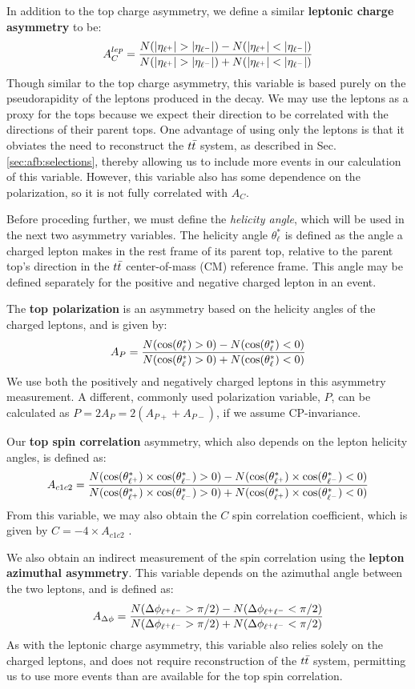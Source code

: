In addition to the top charge asymmetry, we define a similar
\textbf{leptonic charge asymmetry} to be:
\begin{equation}
A_C^{lep} = \asymmetry{|\eta_{\ell^+}|}{|\eta_{\ell^-}|}
\end{equation}
Though similar to the top charge asymmetry, this variable
is based purely on the pseudorapidity of the leptons produced in the
decay. We may use the leptons as a proxy for the tops because we
expect their direction to be correlated with the directions of their
parent tops. One advantage of using only the leptons is that it obviates the
need to reconstruct the $t\bar{t}$ system, as described in Sec.
\ref{sec:afb:selections}, thereby allowing us to include more events in
our calculation of this variable. However, this variable also has some
dependence on the polarization, so it is not fully correlated with $A_C$.

Before proceding further, we must define the \emph{helicity angle}, which
will be used in the next two asymmetry variables.
The helicity angle $\theta^*_{\ell}$ is defined as the angle
a charged lepton makes in the rest frame of its parent top,
relative to the parent top's direction in the $t\bar{t}$ center-of-mass
(CM) reference frame. This angle may be defined separately for the
positive and negative charged lepton in an event.

The \textbf{top polarization} is an asymmetry based on the helicity
angles of the charged leptons, and is given by:
\begin{equation}
A_{P} = \frac{N(\cos(\theta^*_{\ell})>0) - N(\cos(\theta^*_{\ell})<0)}{N(\cos(\theta^*_{\ell})>0) + N(\cos(\theta^*_{\ell})<0)}
\end{equation}
We use both the positively and negatively charged leptons in this
asymmetry measurement. A different, commonly used
polarization variable, $P$, can be calculated as $P = 2 A_P = 2(
A_{P+} + A_{P-})$, if we assume CP-invariance.

Our \textbf{top spin correlation} asymmetry, which also depends on the
lepton helicity angles, is defined as:
\begin{equation}
A_{c1c2} = \frac{N(\cos(\theta^*_{\ell^+}) \times \cos(\theta^*_{\ell^-})>0) - N(\cos(\theta^*_{\ell^+}) \times \cos(\theta^*_{\ell^-})<0)}{N(\cos(\theta^*_{\ell^+}) \times \cos(\theta^*_{\ell^-})>0) + N(\cos(\theta^*_{\ell^+}) \times \cos(\theta^*_{\ell^-})<0)}
\end{equation}
From this variable, we may also obtain the $C$ spin correlation
coefficient, which is given by $C = -4 \times A_{c1c2}$ \cite{spincorrpolcoeff}.

We also obtain an indirect measurement of the spin correlation using
the \textbf{lepton azimuthal asymmetry}. This variable depends on the
azimuthal angle between the two leptons, and is defined as:
\begin{equation}
A_{\Delta\phi} = \frac{N(\Delta\phi_{\ell^+\ell^-}>\pi/2) - N(\Delta\phi_{\ell^+\ell^-}<\pi/2)}{N(\Delta\phi_{\ell^+\ell^-}>\pi/2) + N(\Delta\phi_{\ell^+\ell^-}<\pi/2)}
\end{equation}
As with the leptonic charge asymmetry, this variable also relies
solely on the charged leptons, and does not require reconstruction of
the $t\bar{t}$ system, permitting us to use more events than are
available for the top spin correlation.

